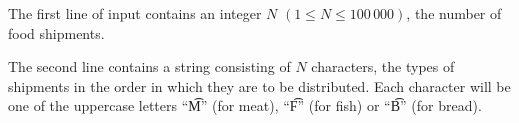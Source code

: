 The first line of input contains an integer $N$ $(1 \le N \le 100\,000)$, the number of food shipments.

The second line contains a string consisting of $N$ characters, the types of shipments in the order in which they are to be distributed. Each character will be one of the uppercase letters ``\t{M}'' (for meat), ``\t{F}'' (for fish) or ``\t{B}'' (for bread).